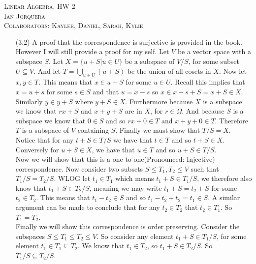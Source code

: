 \documentclass[12pt]{amsart}
\theoremstyle{definition}
\newcommand{\se}{\subseteq}
\begin{document}
\begin{center}
    \textsc{Linear Algebra. HW 2\\ Ian Jorquera\\ Colaborators: Kaylee, Daniel, Sarah, Kylie}
\end{center}
\vspace{1em}

\begin{itemize}
\item[(3.2)]
A proof that the correspondence is surjective is provided in the book. However I will still provide a proof for my self. Let $V$ be a vector space with a subspace $S$. Let $X=\{u+S|u\in U\}$ be a subspace of $V/S$, for some subset $U\se V$. And let $T=\bigcup_{u\in U}(u+S)$ be the union of all cosets in $X$. Now let $x,y\in T$. This means that $x\in u+S$ for some $u\in U$. Recall this implies that $x=u+s$ for some $s\in S$ and that $u=x-s$ so $x\in x-s+S=x+S\in X$. Similarly $y\in y+S$ where $y+S\in X$. Furthermore because $X$ is a subspace we know that $rx+S$ and $x+y+S$ are in $X$, for $r\in \Omega$. And because $S$ is a subspace we know that $0\in S$ and so $rx+0\in T$ and $x+y+0\in T$. Therefore $T$ is a subspace of $V$ containing $S$. Finally we must show that $T/S=X$. Notice that for any $t+S\in T/S$ we have that $t\in T$ and so $t+S\in X$. Conversely for $u+S\in X$, we have that $u\in T$ and so $u+S\in T/S$.\\

Now we will show that this is a one-to-one(Pronounced: Injective) correspondence. Now consider two subsets $S\leq T_1,T_2\leq V$ such that $T_1/S=T_2/S$. WLOG let $t_1\in T_1$ which means $t_1+S\in T_1/S$, we therefore also know that $t_1+S\in T_2/S$, meaning we may write $t_1+S=t_2+S$ for some $t_2\in T_2$. This means that $t_1-t_2\in S$ and so $t_1-t_2+t_2=t_1\in S$. A similar argument can be made to conclude that for any $t_2\in T_2$ that $t_2\in T_1$. So $T_1=T_2$.\\

Finally we will show this correspondence is order preserving. Consider the subspaces $S\leq T_1\leq T_2\leq V$. So consider any element $t_1+S\in T_1/S$, for some element $t_1\in T_1\se T_2$. We know that $t_1\in T_2$, so $t_1+S\in T_2/S$. So $T_1/S\se T_2/S$.\\


\end{itemize}
\end{document}
